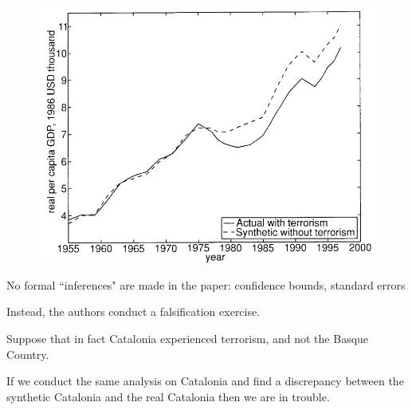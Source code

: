 \documentclass[notes,11pt, aspectratio=169]{beamer}
\newenvironment{wideitemize}{\itemize\addtolength{\itemsep}{10pt}}{\enditemize}
\begin{document}
\begin{frame}{}
    \begin{figure}
        \centering
        \includegraphics[width = .6\textwidth]{figures/ts.png}
        \label{fig:ts}
    \end{figure}
\end{frame}

\begin{frame}

    \begin{wideitemize}
        \item No formal ``inferences" are made in the paper: confidence
        bounds, standard errors
        \item Instead, the authors conduct a falsification exercise.
        
        \medskip 
        
        \begin{wideitemize}
            \item Suppose that in fact Catalonia experienced terrorism, and
            not the Basque Country.
            \item If we conduct the same analysis on Catalonia and find
            a discrepancy between the synthetic Catalonia and the real
            Catalonia then we are in trouble.
        \end{wideitemize}
    \end{wideitemize}
    
\end{frame}
\end{document}
